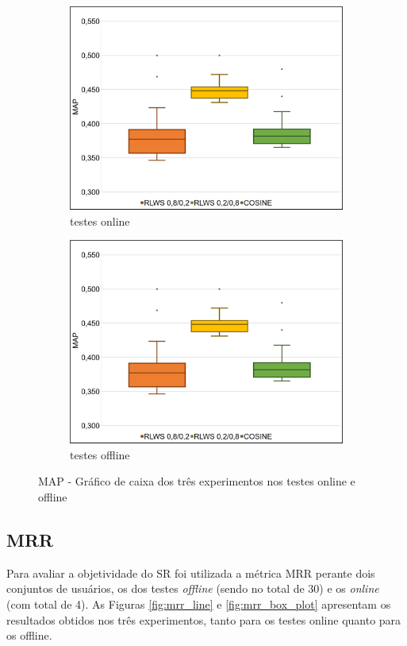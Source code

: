 \begin{figure}
    \begin{subfigure}{.5\textwidth}
        \centering
        \includegraphics[width=.8\linewidth]{imagens/map_box_plot.jpg}
        \caption{testes online}
        \label{fig:map_box_plot_a}
    \end{subfigure}%
    \begin{subfigure}{.5\textwidth}
        \centering
        \includegraphics[width=.8\linewidth]{imagens/map_box_plot.jpg}
        \caption{testes offline}
        \label{fig:map_box_plot_b}
    \end{subfigure}
    \caption{MAP - Gráfico de caixa dos três experimentos nos testes online e offline}
    \label{fig:map_box_plot}
\end{figure}

\subsection{MRR}

Para avaliar a objetividade do \ac{SR} foi utilizada a métrica \ac{MRR} perante dois conjuntos de usuários, os dos testes \textit{offline} (sendo no total de 30) e os \textit{online} (com total de 4). As Figuras \ref{fig:mrr_line} e \ref{fig:mrr_box_plot} apresentam os resultados obtidos nos três experimentos, tanto para os testes online quanto para os offline. 

